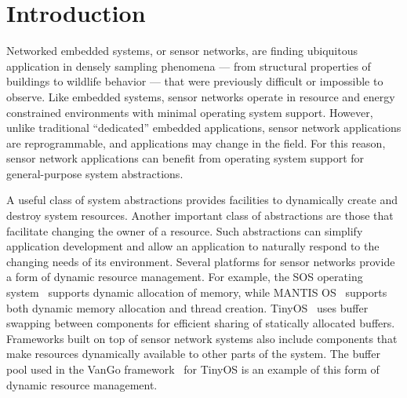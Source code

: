 \section{Introduction}
\label{sec:intro}

Networked embedded systems, or sensor networks, are finding ubiquitous
application in densely sampling phenomena --- from structural
properties of buildings to wildlife behavior --- that were previously
difficult or impossible to observe.  Like embedded systems, sensor
networks operate in resource and energy constrained environments with
minimal operating system support.  However, unlike traditional
``dedicated'' embedded applications, sensor network applications are
reprogrammable, and applications may change in the field.  For this
reason, sensor network applications can benefit from operating system
support for general-purpose system abstractions.

A useful class of system abstractions provides facilities to
dynamically create and destroy system resources.  
%
Another important class of abstractions are those that facilitate
changing the owner of a resource.
%
Such abstractions can simplify application development and allow an
application to naturally respond to the changing needs of its
environment.  
%
Several platforms for sensor networks provide a form of dynamic
resource management.  
%
For example, the SOS operating system~\cite{sos} supports dynamic
allocation of memory, while MANTIS OS~\cite{abrach03mantis} supports
both dynamic memory allocation and thread creation.
TinyOS~\cite{TinyOS} uses buffer swapping between components for
efficient sharing of statically allocated buffers.  Frameworks built on
top of sensor network systems also include components that make
resources dynamically available to other parts of the system.  The
buffer pool used in the VanGo framework~\cite{greenstein05vango} for
TinyOS is an example of this form of dynamic resource management.

%
%


